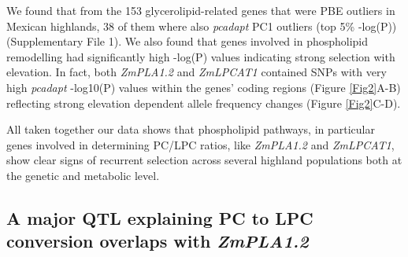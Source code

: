 \documentclass[9pt,twocolumn,twoside,lineno]{BioRxiv}
\begin{document}
We found that from the 153 glycerolipid-related genes that were PBE outliers in Mexican highlands, 38 of them where also \textit{pcadapt} PC1 outliers (top 5\% -log(P)) (Supplementary File 1).
We also found that genes involved in phospholipid remodelling had significantly high -log(P) values indicating strong selection with elevation. 
In fact, both \textit{ZmPLA1.2} and \textit{ZmLPCAT1} contained SNPs with very high \textit{pcadapt} -log10(P) values within the genes' coding regions (Figure \ref{Fig2}A-B) reflecting strong elevation dependent allele frequency changes  (Figure \ref{Fig2}C-D).

All taken together our data shows that phospholipid pathways, in particular genes involved in determining PC/LPC ratios, like \textit{ZmPLA1.2} and \textit{ZmLPCAT1}, show clear signs of recurrent selection across several highland populations both at the genetic and metabolic level. 

\subsection{A major QTL explaining PC to LPC conversion overlaps with \textit{ZmPLA1.2}} 
\end{document}
